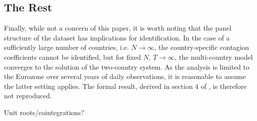 \documentclass[../base.tex]{subfiles}
\begin{document}
\subsection{The Rest}

Finally, while not a concern of this paper, it is worth noting that the panel structure of the dataset has implications for identification. In the case of a sufficiently large number of countries, i.e. $N \rightarrow \infty$, the country-specific contagion coefficients cannot be identified, but for fixed $N$, $T \rightarrow \infty$, the multi-country model converges to the solution of the two-country system. As the analysis is limited to the Eurozone over several years of daily observations, it is reasonable to assume the latter setting applies. The formal result, derived in section 4 of \cite{pesaran2007econometric}, is therefore not reproduced.


Unit roots/cointegrations?
\end{document}
